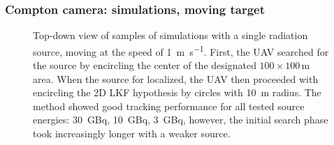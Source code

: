 \documentclass[aspectratio=169]{beamer}
\begin{document}
\begin{frame}[noframenumbering]
\frametitle{Compton camera: simulations, moving target}

  \begin{figure}
    \centering
    \caption{
      Top-down view of samples of simulations with a single radiation source, moving at the speed of \SI{1}{\meter\per\second}.
      First, the UAV searched for the source by encircling the center of the designated $100\times100$\,\si{\meter} area.
      When the source for localized, the UAV then proceeded with encircling the 2D LKF hypothesis by circles with \SI{10}{\meter} radius.
      The method showed good tracking performance for all tested source energies: \SI{30}{\giga\becquerel}, \SI{10}{\giga\becquerel}, \SI{3}{\giga\becquerel}, however, the initial search phase took increasingly longer with a weaker source.
    }
    \label{fig:simulations}
  \end{figure}

\end{frame}

\end{document}
